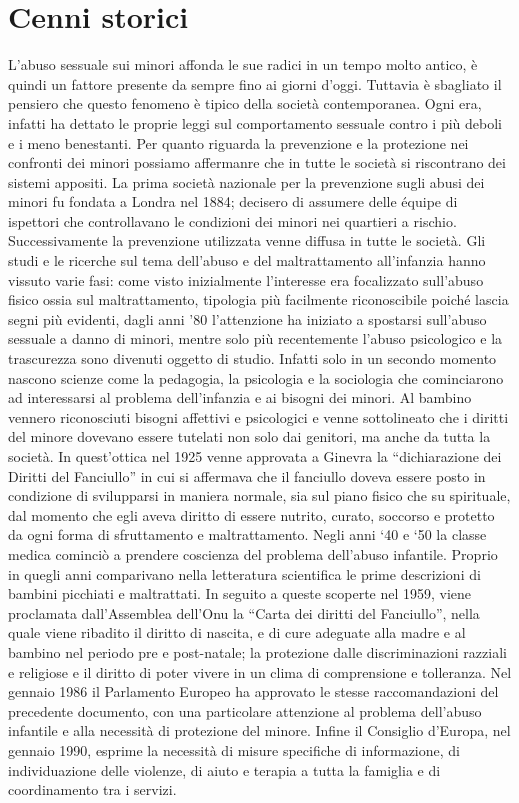 \section{Cenni storici}
L’abuso sessuale sui minori affonda le sue radici in un tempo molto antico, è quindi un fattore presente da sempre fino ai giorni d’oggi. Tuttavia è sbagliato il pensiero che questo fenomeno è tipico della società contemporanea. Ogni era, infatti ha dettato le proprie leggi sul comportamento sessuale contro i più deboli e i meno benestanti. Per quanto riguarda la prevenzione e la protezione nei confronti dei minori possiamo affermanre che in tutte le società si riscontrano dei sistemi appositi. La prima società nazionale per la prevenzione sugli abusi dei minori fu fondata a Londra nel 1884;  decisero di assumere delle équipe di ispettori che controllavano le condizioni dei minori nei quartieri a rischio. Successivamente la prevenzione utilizzata venne diffusa in tutte le società. 
Gli studi e le ricerche sul tema dell’abuso e del maltrattamento all’infanzia hanno vissuto varie fasi: come visto inizialmente l’interesse era focalizzato sull’abuso fisico ossia sul maltrattamento, tipologia più facilmente riconoscibile poiché lascia segni più evidenti, dagli anni ’80 l’attenzione ha iniziato a spostarsi sull’abuso sessuale a danno di minori, mentre solo più recentemente l’abuso psicologico e la trascurezza sono divenuti oggetto di studio. Infatti solo in un secondo momento nascono scienze come la pedagogia, la psicologia e la sociologia che cominciarono ad interessarsi al problema dell’infanzia e ai bisogni dei minori. Al bambino vennero riconosciuti bisogni affettivi e psicologici e venne sottolineato che i diritti del minore dovevano essere tutelati non solo dai genitori, ma anche da tutta la società. In quest’ottica nel 1925 venne approvata a Ginevra la “dichiarazione dei Diritti del Fanciullo” in cui si affermava che il fanciullo doveva essere posto in condizione di svilupparsi in maniera normale, sia sul piano fisico che su spirituale, dal momento che egli aveva diritto di essere nutrito, curato, soccorso e protetto da ogni forma di sfruttamento e maltrattamento. Negli anni ‘40 e ‘50 la classe medica cominciò a prendere coscienza del problema dell’abuso infantile. Proprio in quegli anni comparivano nella letteratura scientifica le prime descrizioni di bambini picchiati e maltrattati. In seguito a queste scoperte nel 1959, viene proclamata dall’Assemblea dell’Onu la “Carta dei diritti del Fanciullo”, nella quale viene ribadito il diritto di nascita, e di cure adeguate alla madre e al bambino nel periodo pre e post-natale; la protezione dalle discriminazioni razziali e religiose e il diritto di poter vivere in un clima di comprensione e tolleranza. Nel gennaio 1986 il Parlamento Europeo ha approvato le stesse raccomandazioni del precedente documento, con una particolare attenzione al problema dell’abuso infantile e alla necessità di protezione del minore. Infine il Consiglio d’Europa, nel gennaio 1990, esprime la necessità di misure specifiche di informazione, di individuazione delle violenze, di aiuto e terapia a tutta la famiglia e di coordinamento tra i servizi.
